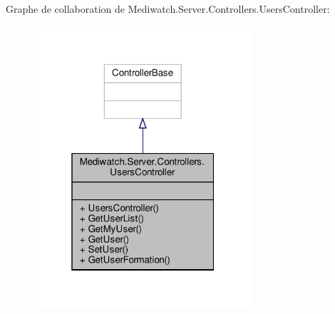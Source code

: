 Graphe de collaboration de Mediwatch.\+Server.\+Controllers.\+Users\+Controller\+:
\nopagebreak
\begin{figure}[H]
\begin{center}
\leavevmode
\includegraphics[width=229pt]{class_mediwatch_1_1_server_1_1_controllers_1_1_users_controller__coll__graph}
\end{center}
\end{figure}
